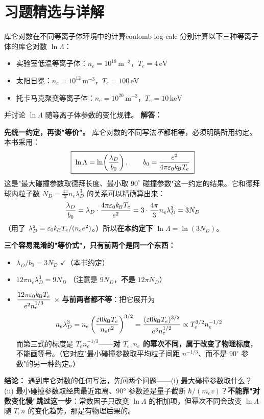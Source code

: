 ﻿%

\section*{习题精选与详解}

\begin{example}{库仑对数在不同等离子体环境中的计算}{coulomb-log-calc}
分别计算以下三种等离子体的库仑对数 $\ln\Lambda$：
\begin{itemize}[leftmargin=*,itemsep=0pt]
\item 实验室低温等离子体：$n_e = 10^{18}\,\mathrm{m}^{-3}$，$T_e = 4\,\mathrm{eV}$
\item 太阳日冕：$n_e = 10^{12}\,\mathrm{m}^{-3}$，$T_e = 100\,\mathrm{eV}$
\item 托卡马克聚变等离子体：$n_e = 10^{20}\,\mathrm{m}^{-3}$，$T_e = 10\,\mathrm{keV}$
\end{itemize}
并讨论 $\ln\Lambda$ 随等离子体参数的变化规律。
\tcblower
\textbf{解答：}

\textbf{先统一约定，再谈"等价"。} 库仑对数的不同写法\emph{不}都相等，必须明确所用约定。本书采用：
\[
\boxed{\;\ln\Lambda = \ln\!\left(\frac{\lambda_D}{b_0}\right),\qquad b_0 = \frac{e^2}{4\pi\varepsilon_0 k_{\!B}T_e}\;}
\]
这是"最大碰撞参数取德拜长度、最小取 $90^\circ$ 碰撞参数"这一约定的结果。它和德拜球内粒子数 $N_D=\frac{4\pi}{3}n_e\lambda_D^3$ 的关系可以精确算出来：
\[
\frac{\lambda_D}{b_0} = \lambda_D\cdot\frac{4\pi\varepsilon_0 k_{\!B}T_e}{e^2} = 3\cdot\frac{4\pi}{3}n_e\lambda_D^3 = 3N_D
\]
（用了 $\lambda_D^2=\varepsilon_0k_{\!B}T_e/(n_ee^2)$。）所以\textbf{在本约定下 $\ln\Lambda=\ln(3N_D)$}。

\textbf{三个容易混淆的"等价式"，只有前两个是同一个东西：}
\begin{itemize}
\item $\lambda_D/b_0 = 3N_D$ \quad$\checkmark$（本书约定）
\item $12\pi n_e\lambda_D^3 = 9N_D$ \quad（注意是 $9N_D$，\textbf{不是} $12\pi N_D$）
\item $\dfrac{12\pi\varepsilon_0k_{\!B}T_e}{e^2n_e^{1/3}}$ \quad$\times$ \textbf{与前两者都不等}：把它展开为
\[
n_e\lambda_D^3 = n_e\left(\frac{\varepsilon0 k_{\!B}T_e}{n_ee^2}\right)^{3/2} = \frac{(\varepsilon0k_{\!B}T_e)^{3/2}}{e^3n_e^{1/2}}
\propto T_e^{3/2}n_e^{-1/2}
\]
而第三式的标度是 $T_en_e^{-1/3}$——\textbf{对 $T_e,n_e$ 的幂次不同，属于改变了物理标度}，不能画等号。（它对应"最小碰撞参数取平均粒子间距 $n^{-1/3}$、而不是 $90^\circ$ 参数"的另一种约定。）
\end{itemize}
\textbf{结论：} 遇到库仑对数的任何写法，先问两个问题——(i) 最大碰撞参数取什么？(ii) 最小碰撞参数取经典最近距离、90° 参数还是量子截断 $\hbar/(m_ev)$？\textbf{不能靠"对数变化慢"跳过这一步}：常数因子只改变 $\ln\Lambda$ 的相加项，但幂次不同会改变 $\ln\Lambda$ 随 $T,n$ 的变化趋势，那是有物理后果的。


\end{example}
